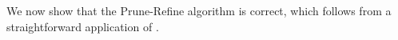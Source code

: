 %

We now show that the Prune-Refine algorithm is correct, which follows from a
straightforward application of .

